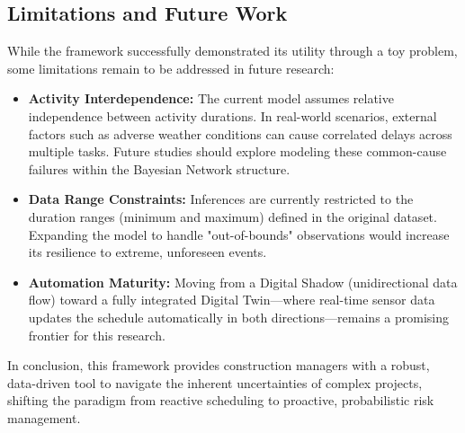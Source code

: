\subsection{Limitations and Future Work}
While the framework successfully demonstrated its utility through a toy problem, some limitations remain to be addressed in future research:
\begin{itemize}
    \item \textbf{Activity Interdependence:} The current model assumes relative independence between activity durations. In real-world scenarios, external factors such as adverse weather conditions can cause correlated delays across multiple tasks. Future studies should explore modeling these common-cause failures within the Bayesian Network structure.
    \item \textbf{Data Range Constraints:} Inferences are currently restricted to the duration ranges (minimum and maximum) defined in the original dataset. Expanding the model to handle "out-of-bounds" observations would increase its resilience to extreme, unforeseen events.
    \item \textbf{Automation Maturity:} Moving from a Digital Shadow (unidirectional data flow) toward a fully integrated Digital Twin—where real-time sensor data updates the schedule automatically in both directions—remains a promising frontier for this research.
\end{itemize}

In conclusion, this framework provides construction managers with a robust, data-driven tool to navigate the inherent uncertainties of complex projects, shifting the paradigm from reactive scheduling to proactive, probabilistic risk management.
